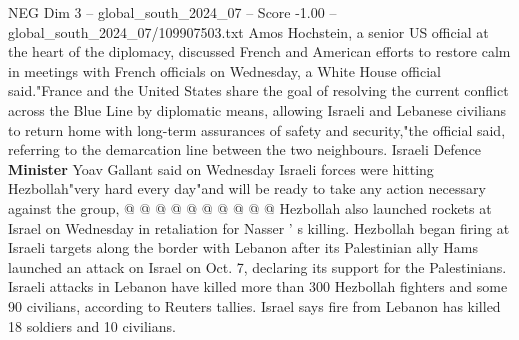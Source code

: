 \begin{textsample}{NEG Dim 3 – global\_south\_2024\_07 – Score -1.00 – global\_south\_2024\_07/109907503.txt}
Amos Hochstein, a senior US official at the heart of the diplomacy, discussed French and American efforts to restore calm in meetings with French officials on Wednesday, a White House official said."France and the United States share the goal of resolving the current conflict across the Blue Line by diplomatic means, allowing Israeli and Lebanese civilians to return home with long-term assurances of safety and security,"the official said, referring to the demarcation line between the two neighbours.
Israeli Defence \textbf{Minister} Yoav Gallant said on Wednesday Israeli forces were hitting Hezbollah"very hard every day"and will be ready to take any action necessary against the group, @ @ @ @ @ @ @ @ @ @ Hezbollah also launched rockets at Israel on Wednesday in retaliation for Nasser ' s killing.
Hezbollah began firing at Israeli targets along the border with Lebanon after its Palestinian ally Hams launched an attack on Israel on Oct. 7, declaring its support for the Palestinians.
Israeli attacks in Lebanon have killed more than 300 Hezbollah fighters and some 90 civilians, according to Reuters tallies.
Israel says fire from Lebanon has killed 18 soldiers and 10 civilians.

\end{textsample}
